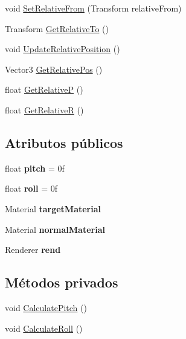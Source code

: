 \begin{DoxyCompactItemize}
\item 
void \mbox{\hyperlink{class_target_model_a0a23959221104882e778ae3e7d10fe11}{Set\+Relative\+From}} (Transform relative\+From)
\item 
Transform \mbox{\hyperlink{class_target_model_a601f2538a41b5bdaba72c3f81d820710}{Get\+Relative\+To}} ()
\item 
void \mbox{\hyperlink{class_target_model_a41b6989fae346f10e3d58ccd0587fc83}{Update\+Relative\+Position}} ()
\item 
Vector3 \mbox{\hyperlink{class_target_model_a098d820aa132eb79824aa019d1e0a3cb}{Get\+Relative\+Pos}} ()
\item 
float \mbox{\hyperlink{class_target_model_a9dd0c95572ab63199d214ae7517c55bf}{Get\+RelativeP}} ()
\item 
float \mbox{\hyperlink{class_target_model_ae564153ce4906bd59461949b2531b5ff}{Get\+RelativeR}} ()
\end{DoxyCompactItemize}
\subsection*{Atributos públicos}
\begin{DoxyCompactItemize}
\item 
\mbox{\label{class_target_model_a7586759a1d22048b40fa4f1cb0ec9b4a}} 
float {\bfseries pitch} = 0f
\item 
\mbox{\label{class_target_model_a3ce8f5a45b53a1996364e6e5e3663368}} 
float {\bfseries roll} = 0f
\item 
\mbox{\label{class_target_model_ae29e0799432fa79b04a4a2f9a5260ba3}} 
Material {\bfseries target\+Material}
\item 
\mbox{\label{class_target_model_a9944462b2a67606e945a45fea29b7650}} 
Material {\bfseries normal\+Material}
\item 
\mbox{\label{class_target_model_a0fde8af97987685b579466df499c8179}} 
Renderer {\bfseries rend}
\end{DoxyCompactItemize}
\subsection*{Métodos privados}
\begin{DoxyCompactItemize}
\item 
void \mbox{\hyperlink{class_target_model_aa46b3a43a11a77e303ca082c8d29b998}{Calculate\+Pitch}} ()
\item 
void \mbox{\hyperlink{class_target_model_a503c190ab713118b3eb98569c645f4a1}{Calculate\+Roll}} ()
\end{DoxyCompactItemize}
